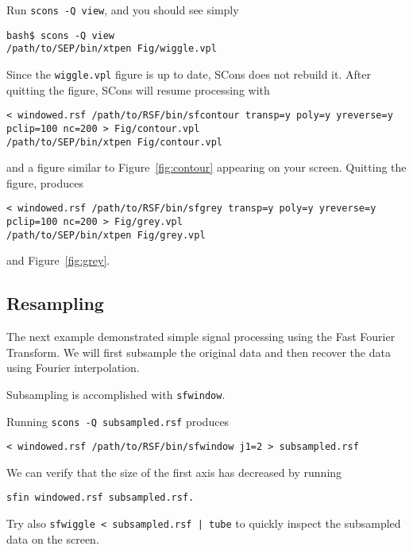 Run \texttt{scons -Q view}, and you should see simply
\begin{verbatim}
bash$ scons -Q view
/path/to/SEP/bin/xtpen Fig/wiggle.vpl
\end{verbatim}
Since the \texttt{wiggle.vpl} figure is up to date, SCons does not rebuild
it. After quitting the figure, SCons will resume processing with
\begin{verbatim}
< windowed.rsf /path/to/RSF/bin/sfcontour transp=y poly=y yreverse=y 
pclip=100 nc=200 > Fig/contour.vpl
/path/to/SEP/bin/xtpen Fig/contour.vpl
\end{verbatim}
and a figure similar to Figure~\ref{fig:contour} appearing on your
screen. Quitting the figure, produces
\begin{verbatim}
< windowed.rsf /path/to/RSF/bin/sfgrey transp=y poly=y yreverse=y 
pclip=100 nc=200 > Fig/grey.vpl
/path/to/SEP/bin/xtpen Fig/grey.vpl
\end{verbatim}
and Figure~\ref{fig:grey}.


\subsection{Resampling}

The next example demonstrated simple signal processing using the Fast Fourier
Transform. We will first subsample the original data and then recover the data
using Fourier interpolation.

Subsampling is accomplished with \texttt{sfwindow}.


Running \texttt{scons -Q subsampled.rsf} produces
\begin{verbatim}
< windowed.rsf /path/to/RSF/bin/sfwindow j1=2 > subsampled.rsf
\end{verbatim}
We can verify that the size of the first axis has decreased by running

\begin{verbatim}
sfin windowed.rsf subsampled.rsf. 
\end{verbatim}

Try also \texttt{sfwiggle <
  subsampled.rsf | tube} to quickly inspect the subsampled data on the screen.


